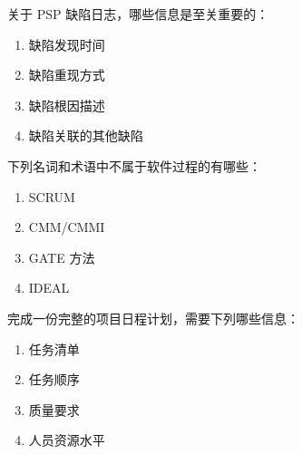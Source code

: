 \begin{problem}
	关于 PSP 缺陷日志，哪些信息是至关重要的：
    \vspace{-0.8em}
    \begin{multicols}{2}
        \begin{enumerate}[label=\Alph*.]
            \item 缺陷发现时间
            \item 缺陷重现方式
            \item 缺陷根因描述
            \item 缺陷关联的其他缺陷
        \end{enumerate}
    \end{multicols}
    \vspace{-1em}
\end{problem}



\begin{problem}
	下列名词和术语中不属于软件过程的有哪些：
    \vspace{-0.8em}
    \begin{multicols}{4}
        \begin{enumerate}[label=\Alph*.]
            \item SCRUM
            \item CMM/CMMI
            \item GATE 方法
            \item IDEAL
        \end{enumerate}
    \end{multicols}
    \vspace{-1em}
\end{problem}




\begin{problem}
	完成一份完整的项目日程计划，需要下列哪些信息：
    \vspace{-0.8em}
    \begin{multicols}{4}
        \begin{enumerate}[label=\Alph*.]
            \item 任务清单
            \item 任务顺序
            \item 质量要求
            \item 人员资源水平
        \end{enumerate}
    \end{multicols}
    \vspace{-1em}
\end{problem}



